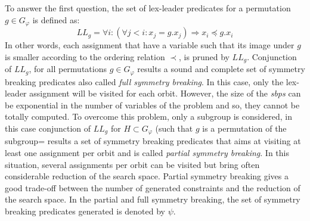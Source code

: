 To answer the first question, the set of lex-leader predicates for a permutation $g \in G_\varphi$ is defined as:
$$LL_g = \forall i : (\forall j < i : x_j = g.x_j) \Rightarrow  x_i \preceq g.x_i$$
In other words, each assignment that have a variable such that its image under $g$ is smaller according to the ordering relation $\prec$, is pruned by $LL_g$.
Conjunction of $LL_g$, for all permutations  $g \in G_{\varphi} $ results a sound and complete set of symmetry breaking predicates also called \emph{full symmetry breaking}.
In this case, only the lex-leader assignment will be visited for each orbit.
However, the size of the \textit{sbps} can be exponential in the number of variables of the problem and so, they cannot be totally computed.
To overcome this problem, only a subgroup is considered, in this case 
conjunction of $LL_g$ for $H \subset G_{\varphi}$ (such that $g$ is a permutation of the subgroup= results a set of symmetry breaking predicates 
that aims at visiting at least one assignment per orbit and is called \emph{partial symmetry breaking}.
In this situation, several assignments per orbit can be visited but bring often considerable reduction of the
search space. Partial symmetry breaking gives a good trade-off between the number of generated constraints and the reduction of the search space.
In the partial and full symmetry breaking, the set of symmetry breaking predicates generated is denoted by $\psi$.


%
%

